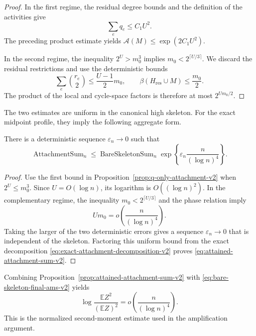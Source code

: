 \begin{proof}
In the first regime, the residual degree bounds and the definition of the
activities give
\[
  \sum_e q_e\le C_1U^2.
\]
The preceding product estimate yields
$\mathcal A(M)\le\exp(2C_1U^2)$.

In the second regime, the inequality $2^U>m_0^3$ implies
$m_0<2^{\lceil U/3\rceil}$.  We discard the residual restrictions and use the
deterministic bounds
\[
  \sum_e\binom{r_e}{2}
  \le \frac{U-1}{2}m_0,
  \qquad
  \beta(H_{\mathrm{res}}\cup M)
  \le \frac{m_0}{2}.
\]
The product of the local and cycle-space factors is therefore at most
$2^{Um_0/2}$.
\end{proof}

The two estimates are uniform in the canonical high skeleton.  For the exact
midpoint profile, they imply the following aggregate form.

\begin{proposition}
\label{prop:attained-attachment-sum-v2}
There is a deterministic sequence $\varepsilon_n\to0$ such that
\begin{equation}
  \operatorname{AttachmentSum}_n
  \le
  \operatorname{BareSkeletonSum}_n
  \exp\!\left\{
    \varepsilon_n\frac{n}{(\log n)^4}
  \right\}.
  \label{eq:attained-attachment-sum-v2}
\end{equation}
\end{proposition}

\begin{proof}
Use the first bound in Proposition~\ref{prop:q-only-attachment-v2} when
$2^U\le m_0^3$.  Since $U=O(\log n)$, its logarithm is $O((\log n)^2)$.
In the complementary regime, the inequality
$m_0<2^{\lceil U/3\rceil}$ and the phase relation imply
\[
  Um_0=o\!\left(\frac{n}{(\log n)^4}\right).
\]
Taking the larger of the two deterministic errors gives a sequence
$\varepsilon_n\to0$ that is independent of the skeleton.  Factoring this
uniform bound from the exact decomposition
\eqref{eq:exact-attachment-decomposition-v2} proves
\eqref{eq:attained-attachment-sum-v2}.
\end{proof}

Combining Proposition~\ref{prop:attained-attachment-sum-v2} with
\eqref{eq:bare-skeleton-final-ams-v2} yields
\[
  \log\frac{\mathbb E Z^2}{(\mathbb E Z)^2}
  =
  o\!\left(\frac{n}{(\log n)^4}\right).
\]
This is the normalized second-moment estimate used in the amplification
argument.
